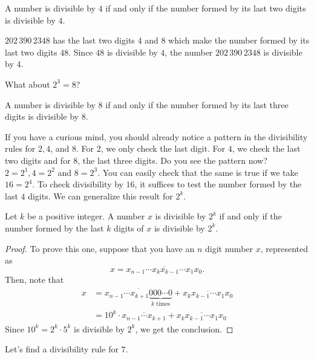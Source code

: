 \documentclass{subfile}
\begin{document}
\begin{proposition}[Divisibility by $4$]
	A number is divisible by $4$ if and only if the number formed by its last two digits is divisible by $4$.
\end{proposition}

\begin{example}
	$202\, 390\, 2348$ has the last two digits $4$ and $8$ which make the number formed by its last two digits $48$. Since $48$ is divisible by $4$, the number $202\, 390\, 2348$ is divisible by $4$.
\end{example}

What about $2^3=8$?

\begin{proposition}[Divisibility by $8$]
	A number is divisible by $8$ if and only if the number formed by its last three digits is divisible by $8$.
\end{proposition}

If you have a curious mind, you should already notice a pattern in the divisibility rules for $2,4$, and $8$. For $2$, we only check the last digit. For $4$, we check the last two digits and for $8$, the last three digits. Do you see the pattern now? $2=2^1,4=2^2$ and $8=2^3$. You can easily check that the same is true if we take $16=2^4$. To check divisibility by $16$, it suffices to test the number formed by the last $4$ digits. We can generalize this result for $2^k$.

\begin{theorem}[Divisibility by $2^k$]
	Let $k$ be a positive integer. A number $x$ is divisible by $2^k$ if and only if the number formed by the last $k$ digits of $x$ is divisible by $2^k$.
\end{theorem}

\begin{proof}
	To prove this one, suppose that you have an $n$ digit number $x$, represented as $$x = \overline{x_{n-1} \cdots x_k x_{k-1} \cdots x_1 x_0 }.$$ Then, note that
	\begin{align*}
		x &= \overline{x_{n-1} \cdots x_{k+1} \underbrace{000\cdots 0}_{k \text{ times}}} + \overline{x_k x_{k-1} \cdots x_1 x_0} \\
		&= 10^k \cdot \overline{x_{n-1} \cdots x_{k+1}} +  \overline{x_k x_{k-1} \cdots x_1 x_0}
	\end{align*}
	Since $10^k=2^k \cdot 5^k$ is divisible by $2^k$, we get the conclusion.
\end{proof}

Let's find a divisibility rule for $7$.
\end{document}

